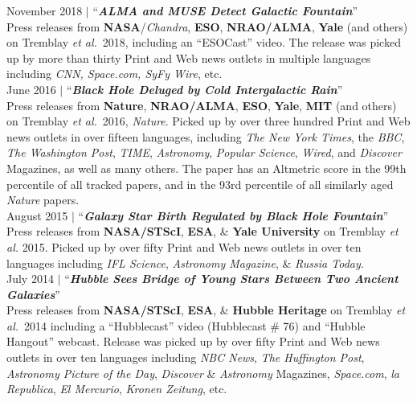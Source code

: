 \documentclass[11pt]{article}
\begin{document}
\parbox{5.15in}{
November 2018 $|$ ``\textit{\textbf{ALMA and MUSE Detect Galactic Fountain}}'' \\ Press releases from \textbf{NASA}/\textit{Chandra}, \textbf{ESO}, \textbf{NRAO/ALMA}, \textbf{Yale} (and others) on Tremblay \textit{et al.}~2018, including an ``ESOCast'' video. The release was picked up by more than thirty Print and Web news outlets in multiple languages including \textit{CNN, Space.com, SyFy Wire}, etc. \\


June 2016 $|$ ``\textit{\textbf{Black Hole Deluged by Cold Intergalactic Rain}}'' \\ Press releases from \textbf{Nature}, \textbf{NRAO/ALMA}, \textbf{ESO}, \textbf{Yale}, \textbf{MIT} (and others) on Tremblay \textit{et al.}~2016, \textit{Nature}. Picked up by over three hundred Print and Web news outlets in over fifteen languages, including \textit{The New York Times}, the \textit{BBC}, \textit{The Washington Post}, \textit{TIME}, \textit{Astronomy}, \textit{Popular Science}, \textit{Wired}, and \textit{Discover} Magazines, as well as many others. The paper has an Altmetric score in the 99th percentile of all tracked papers, and in the 93rd percentile of all similarly aged \textit{Nature} papers.   \\



August 2015 $|$ ``\textit{\textbf{Galaxy Star Birth Regulated by Black Hole Fountain}}''\\
Press releases from \textbf{NASA/STScI}, \textbf{ESA}, \& \textbf{Yale University} on Tremblay \textit{et al.} 2015. Picked up by over fifty Print and Web news outlets in over ten languages including \textit{IFL Science}, \textit{Astronomy Magazine}, \& \textit{Russia Today}. \\

July 2014 $|$ ``\textbf{\textit{Hubble Sees Bridge of Young Stars Between Two Ancient Galaxies}}''\\ Press releases from \textbf{NASA/STScI}, \textbf{ESA}, \& \textbf{Hubble Heritage} on Tremblay \textit{et al.}~2014 including a ``Hubblecast'' video (Hubblecast \# 76) and ``Hubble Hangout'' webcast. Release was picked up by over fifty Print and Web news outlets in over ten languages including \textit{NBC News}, \textit{The Huffington Post}, \textit{Astronomy Picture of the Day}, \textit{Discover} \& \textit{Astronomy} Magazines, \textit{Space.com}, \textit{la Republica}, \textit{El Mercurio}, \textit{Kronen Zeitung}, etc. \\
}
\end{document}
